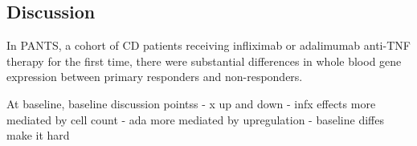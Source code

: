 \begin{outline}



\section{Discussion}

In \gls{PANTS}, a cohort of \gls{CD} patients receiving infliximab or adalimumab anti-TNF therapy for the first time,
there were substantial differences in whole blood gene expression between primary responders and non-responders.

At baseline, 
baseline discussion pointss
- x up and down
- infx effects more mediated by cell count
- ada more mediated by upregulation
- baseline diffes make it hard



\end{outline}
